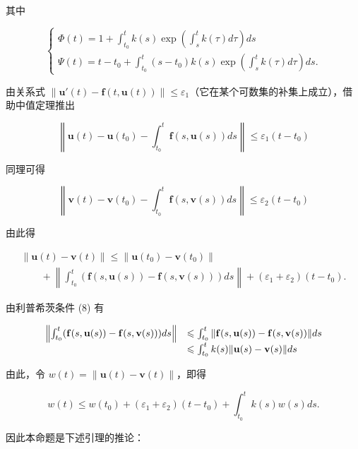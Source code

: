 其中

\[
\left\{ \begin{array}{l} \Phi (t) = 1 + \int_ {t _ {0}} ^ {t} k (s) \exp \left(\int_ {s} ^ {t} k (\tau) d \tau\right) d s \\ \Psi (t) = t - t _ {0} + \int_ {t _ {0}} ^ {t} (s - t _ {0}) k (s) \exp \left(\int_ {s} ^ {t} k (\tau) d \tau\right) d s. \end{array} \right.\tag{10}
\]

由关系式 \(\left\| \mathbf{u}'(t) - \mathbf{f}(t, \mathbf{u}(t)) \right\| \leqslant \varepsilon_1\)（它在某个可数集的补集上成立），借助中值定理推出

\[
\left\| \mathbf {u} (t) - \mathbf {u} (t _ {0}) - \int_ {t _ {0}} ^ {t} \mathbf {f} (s, \mathbf {u} (s)) d s \right\| \leqslant \varepsilon_ {1} (t - t _ {0})
\]

同理可得

\[
\left\| \mathbf {v} (t) - \mathbf {v} (t _ {0}) - \int_ {t _ {0}} ^ {t} \mathbf {f} (s, \mathbf {v} (s)) d s \right\| \leqslant \varepsilon_ {2} (t - t _ {0})
\]

由此得

\[
\begin{array}{l} \| \mathbf {u} (t) - \mathbf {v} (t) \| \leqslant \| \mathbf {u} (t _ {0}) - \mathbf {v} (t _ {0}) \| \\ \qquad + \left\| \int_ {t _ {0}} ^ {t} (\mathbf {f} (s, \mathbf {u} (s)) - \mathbf {f} (s, \mathbf {v} (s))) d s \right\| + (\varepsilon_ {1} + \varepsilon_ {2}) (t - t _ {0}). \end{array}
\]

由利普希茨条件 (8) 有

\[
\begin{array}{r l} \left\| \int_ {t _ {0}} ^ {t} (\mathbf {f} (s, \mathbf {u} (s)) - \mathbf {f} (s, \mathbf {v} (s))) d s \right\| & \leqslant \int_ {t _ {0}} ^ {t} \| \mathbf {f} (s, \mathbf {u} (s)) - \mathbf {f} (s, \mathbf {v} (s)) \| d s \\ & \leqslant \int_ {t _ {0}} ^ {t} k (s) \| \mathbf {u} (s) - \mathbf {v} (s) \| d s \end{array}
\]

由此，令 \(w(t) = \|\mathbf{u}(t) - \mathbf{v}(t)\|\)，即得

\[
w (t) \leqslant w \left(t _ {0}\right) + \left(\varepsilon_ {1} + \varepsilon_ {2}\right) \left(t - t _ {0}\right) + \int_ {t _ {0}} ^ {t} k (s) w (s) d s.\tag{11}
\]

因此本命题是下述引理的推论：

